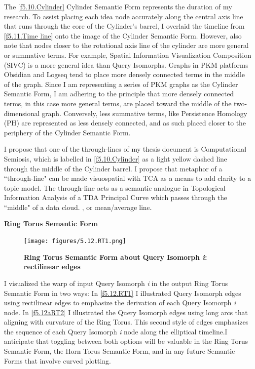 The \autoref{f5.10.Cylinder} Cylinder Semantic Form represents the duration of my research. To assist placing each idea node accurately along the central axis line that runs through the core of the Cylinder’s barrel, I overlaid the timeline from \autoref{f5.11.Time line} onto the image of the Cylinder Semantic Form. However, also note that nodes closer to the rotational axis line of the cylinder are more general or summative terms. For example, Spatial Information Visualization Composition (SIVC) is a more general idea than Query Isomorphs. Graphs in PKM platforms Obsidian and Logseq tend to place more densely connected terms in the middle of the graph. Since I am representing a series of PKM graphs as the Cylinder Semantic Form, I am adhering to the principle that more densely connected terms, in this case more general terms, are placed toward the middle of the two-dimensional graph. Conversely, less summative terms, like Persistence Homology (PH) are represented as less densely connected, and as such placed closer to the periphery of the Cylinder Semantic Form. 

I propose that one of the through-lines of my thesis document is Computational Semiosis, which is labelled in \autoref{f5.10.Cylinder} as a light yellow dashed line through the middle of the Cylinder barrel. I propose that metaphor of a ``through-line" can be made visuospatial with TCA as a means to add clarity to a topic model. The through-line acts as a semantic analogue in Topological Information Analysis of a TDA Principal Curve which passes through the ``middle" of a data cloud. \citep[p. 1]{kegl_learning_2000}, or mean/average line.
\clearpage



\textbf{Ring Torus Semantic Form}

\FloatBarrier  
\begin{figure}[h!]
    \centering
    \texttt{[image: figures/5.12.RT1.png]}
    \caption[Ring Torus Semantic Form about Query Isomorph \textit{i}: rectilinear edges]{\textbf{Ring Torus Semantic Form about Query Isomorph \textit{i}: rectilinear edges}}
    \label{f5.12.RT1}
\end{figure}
\FloatBarrier

I visualized the warp of input Query Isomorph \textit{i} in the output Ring Torus Semantic Form in two ways: In \autoref{f5.12.RT1}  I illustrated Query Isomorph edges using rectilinear edges to emphasize the derivation of each Query Isomorph \textit{i} node. In \autoref{f5.12aRT2} I illustrated the Query Isomorph edges using long arcs that aligning with curvature of the Ring Torus. This second style of edges emphasizes the sequence of each Query Isomorph \textit{i} node along the elliptical timeline.I anticipate that toggling between both options will be valuable in the Ring Torus Semantic Form, the Horn Torus Semantic Form, and in any future Semantic Forms that involve curved plotting. 


